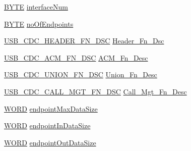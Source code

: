\begin{DoxyCompactItemize}
\item 
\hyperlink{_generic_type_defs_8h_a4ae1dab0fb4b072a66584546209e7d58}{B\+Y\+T\+E} \hyperlink{struct___c_o_m_m___i_n_t_e_r_f_a_c_e___d_e_t_a_i_l_s_a04971351adcb65ce1dd649d445c4c414}{interface\+Num}
\item 
\hyperlink{_generic_type_defs_8h_a4ae1dab0fb4b072a66584546209e7d58}{B\+Y\+T\+E} \hyperlink{struct___c_o_m_m___i_n_t_e_r_f_a_c_e___d_e_t_a_i_l_s_ae7efe3ea4a38a1939f37d7e220654771}{no\+Of\+Endpoints}
\item 
\hyperlink{usb__host__cdc_8h_aca51081eae59915d8b14d07c4e90f502}{U\+S\+B\+\_\+\+C\+D\+C\+\_\+\+H\+E\+A\+D\+E\+R\+\_\+\+F\+N\+\_\+\+D\+S\+C} \hyperlink{struct___c_o_m_m___i_n_t_e_r_f_a_c_e___d_e_t_a_i_l_s_a5f906734c0e500e0bfef453695865f54}{Header\+\_\+\+Fn\+\_\+\+Dsc}
\item 
\hyperlink{usb__host__cdc_8h_a17f4535208bb54521b18cffd0b12265d}{U\+S\+B\+\_\+\+C\+D\+C\+\_\+\+A\+C\+M\+\_\+\+F\+N\+\_\+\+D\+S\+C} \hyperlink{struct___c_o_m_m___i_n_t_e_r_f_a_c_e___d_e_t_a_i_l_s_a90d55740b3bc4ec1dddd50ee55becae6}{A\+C\+M\+\_\+\+Fn\+\_\+\+Desc}
\item 
\hyperlink{usb__host__cdc_8h_a8e8e004c7e227887a52e915219410d1b}{U\+S\+B\+\_\+\+C\+D\+C\+\_\+\+U\+N\+I\+O\+N\+\_\+\+F\+N\+\_\+\+D\+S\+C} \hyperlink{struct___c_o_m_m___i_n_t_e_r_f_a_c_e___d_e_t_a_i_l_s_a08960cb90f86c83e213b24e2eaa49d3d}{Union\+\_\+\+Fn\+\_\+\+Desc}
\item 
\hyperlink{usb__host__cdc_8h_ab41d0170fbbc1b6912df1cc0e96685a9}{U\+S\+B\+\_\+\+C\+D\+C\+\_\+\+C\+A\+L\+L\+\_\+\+M\+G\+T\+\_\+\+F\+N\+\_\+\+D\+S\+C} \hyperlink{struct___c_o_m_m___i_n_t_e_r_f_a_c_e___d_e_t_a_i_l_s_a2d44754e8914910088a550d1133a98fd}{Call\+\_\+\+Mgt\+\_\+\+Fn\+\_\+\+Desc}
\item 
\hyperlink{_generic_type_defs_8h_a2b0e863dadf920709ec53d9088ee7c91}{W\+O\+R\+D} \hyperlink{struct___c_o_m_m___i_n_t_e_r_f_a_c_e___d_e_t_a_i_l_s_a07b1a90d117cf469938e2f47a3e6183c}{endpoint\+Max\+Data\+Size}
\item 
\hyperlink{_generic_type_defs_8h_a2b0e863dadf920709ec53d9088ee7c91}{W\+O\+R\+D} \hyperlink{struct___c_o_m_m___i_n_t_e_r_f_a_c_e___d_e_t_a_i_l_s_ab7ad72c61cd08e04d3cc7afa72bdb479}{endpoint\+In\+Data\+Size}
\item 
\hyperlink{_generic_type_defs_8h_a2b0e863dadf920709ec53d9088ee7c91}{W\+O\+R\+D} \hyperlink{struct___c_o_m_m___i_n_t_e_r_f_a_c_e___d_e_t_a_i_l_s_a1a13630966ba60004ab5c04a30a626b4}{endpoint\+Out\+Data\+Size}
\item 

\end{DoxyCompactItemize}
